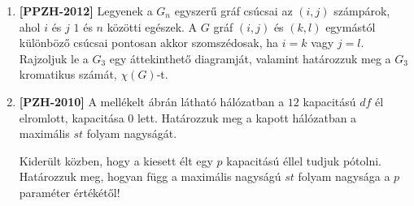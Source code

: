 \documentclass[a4paper, 12pt]{article}
\begin{document}
\begin{enumerate}
            \item \textbf{[PPZH-2012]} Legyenek a $G_n$ egyszerű gráf csúcsai az $(i,j)$ számpárok, ahol $i$ és $j$ $1$ és $n$ közötti egészek. A $G$ gráf $(i,j)$ és $(k,l)$ egymástól különböző csúcsai pontosan akkor szomszédosak, ha $i=k$ vagy $j=l$. Rajzoljuk le a $G_3$ egy áttekinthető diagramját, valamint határozzuk meg a $G_3$ kromatikus számát, $\chi(G)$-t.
            \item \textbf{[PZH-2010]} A mellékelt ábrán látható hálózatban a $12$ kapacitású $df$ él elromlott, kapacitása $0$ lett. Határozzuk meg a kapott hálózatban a maximális $st$ folyam nagyságát.
            \begin{figure}[!ht]
                \centering
                
            \end{figure}
            
            Kiderült közben, hogy a kiesett élt egy $p$ kapacitású éllel tudjuk pótolni. Határozzuk meg, hogyan függ a maximális nagyságú  $st$ folyam nagysága a $p$ paraméter értékétől!


\end{enumerate}
\end{document}
